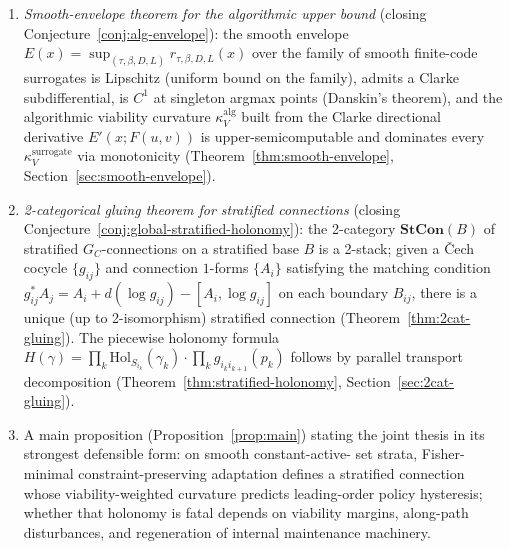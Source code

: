 \documentclass[11pt,a4paper]{article}
\theoremstyle{plain}
\theoremstyle{definition}
\theoremstyle{remark}
\newcommand{\kk}{\kappa_{\!V}}
\begin{document}
\begin{enumerate}[leftmargin=*,itemsep=2pt]
fold-changes on the matched proteome ($r \approx +0.01$ on the
$169$-gene subset where the transcript association is $+0.42$;
replicated on the Schmidt et al.\ $22$-condition quantitative
triplicate proteome, $r = -0.08$ on the $366$-gene intersection,
with protein and transcript magnitudes comparable and the graded
organization transcript-specific), localizing the association to
the regulatory layer (Studies~E24--E27,
Sections~\ref{sec:novelty-v17}--\ref{sec:novelty-v20}). All biological claims are correlational,
with platform, perturbation-class, and coverage limitations stated
explicitly.
\item \emph{Smooth-envelope theorem for the algorithmic upper bound}
(closing Conjecture~\ref{conj:alg-envelope}): the smooth envelope
$E(x) = \sup_{(\tau, \beta, D, L)} r_{\tau, \beta, D, L}(x)$ over the
family of smooth finite-code surrogates is Lipschitz (uniform bound on
the family), admits a Clarke subdifferential, is $C^1$ at singleton
argmax points (Danskin's theorem), and the algorithmic viability
curvature $\kk^{\mathrm{alg}}$ built from the Clarke directional
derivative $E'(x; F(u, v))$ is upper-semicomputable and dominates
every $\kk^{\mathrm{surrogate}}$ via monotonicity
(Theorem~\ref{thm:smooth-envelope}, Section~\ref{sec:smooth-envelope}).
\item \emph{2-categorical gluing theorem for stratified connections}
(closing Conjecture~\ref{conj:global-stratified-holonomy}): the
2-category $\mathbf{StCon}(B)$ of stratified $G_C$-connections on a
stratified base $B$ is a 2-stack; given a Čech cocycle $\{g_{ij}\}$
and connection $1$-forms $\{A_i\}$ satisfying the matching condition
$g_{ij}^* A_j = A_i + d(\log g_{ij}) - [A_i, \log g_{ij}]$ on each
boundary $B_{ij}$, there is a unique (up to 2-isomorphism) stratified
connection (Theorem~\ref{thm:2cat-gluing}). The piecewise holonomy
formula $H(\gamma) = \prod_k \mathrm{Hol}_{S_{i_k}}(\gamma_k) \cdot
\prod_k g_{i_k i_{k+1}}(p_k)$ follows by parallel transport
decomposition (Theorem~\ref{thm:stratified-holonomy},
Section~\ref{sec:2cat-gluing}).
\item A main proposition (Proposition~\ref{prop:main}) stating the
joint thesis in its strongest defensible form: on smooth constant-active-
set strata, Fisher-minimal constraint-preserving adaptation defines a
stratified connection whose viability-weighted curvature predicts
leading-order policy hysteresis; whether that holonomy is fatal depends
on viability margins, along-path disturbances, and regeneration of
internal maintenance machinery.
\end{enumerate}
\end{document}
